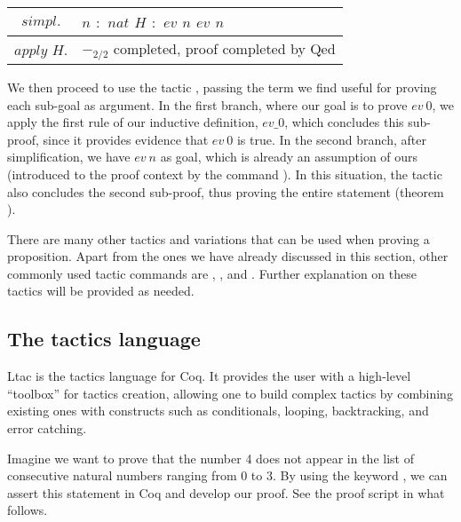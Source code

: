 \begin{longtable}{| S | P |}
	\hline
	 & $n$$ $ $ : $ $ nat$\linebreak
	$H$$ $ $ : $ $ ev $ $ n$\linebreak
	\fracrule\linebreak
	$ev $ $ n$\\

	\hline
	$apply $ $ H.$ & $-_{2/2}$ completed, proof completed by Qed \label{Proofs:coq-example:Theorem:ev-minus2} \\
	\hline
\end{longtable}

We then proceed to use the tactic , passing the term we find useful for proving each sub-goal as argument. In the first branch, where our goal is to prove $ ev \ 0 $, we apply the first rule of our inductive definition, $ ev\_0 $, which concludes this sub-proof, since it provides evidence that $ ev \ 0 $ is true. In the second branch, after simplification, we have $ ev \ n $ as goal, which is already an assumption of ours (introduced to the proof context by the command ). In this situation, the tactic  also concludes the second sub-proof, thus proving the entire statement (theorem ).

There are many other tactics and variations that can be used when proving a proposition. Apart from the ones we have already discussed in this section, other commonly used tactic commands are , , and . Further explanation on these tactics will be provided as needed.

\subsection{The tactics language}

Ltac is the tactics language for Coq. It provides the user with a high-level ``toolbox''  for tactics creation, allowing one to build complex tactics by combining existing ones with constructs such as conditionals, looping, backtracking, and error catching.

Imagine we want to prove that the number 4 does not appear in the list of consecutive natural numbers ranging from 0 to 3. By using the keyword , we can assert this statement in Coq and develop our proof. See the proof script in what follows.

